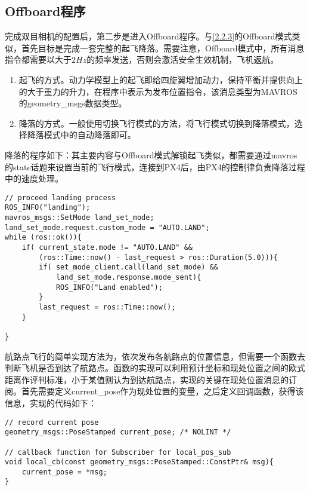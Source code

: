 \subsection{Offboard程序} \label{4.2.2}

完成双目相机的配置后，第二步是进入Offboard程序。与\ref{2.2.3}的Offboard模式类似，首先目标是完成一套完整的起飞降落。需要注意，Offboard模式中，所有消息指令都需要以大于$2Hz$的频率发送，否则会激活安全生效机制，飞机返航。

\begin{enumerate}
	\item 起飞的方式。动力学模型上的起飞即给四旋翼增加动力，保持平衡并提供向上的大于重力的升力，在程序中表示为发布位置指令，该消息类型为MAVROS的geometry\_msgs数据类型。
	\item 降落的方式。一般使用切换飞行模式的方法，将飞行模式切换到降落模式，选择降落模式中的自动降落即可。
\end{enumerate}

降落的程序如下：其主要内容与Offboard模式解锁起飞类似，都需要通过mavros的state话题来设置当前的飞行模式，连接到PX4后，由PX4的控制律负责降落过程中的速度处理。

\begin{verbatim}
// proceed landing process
ROS_INFO("landing");
mavros_msgs::SetMode land_set_mode;
land_set_mode.request.custom_mode = "AUTO.LAND";
while (ros::ok()){
    if( current_state.mode != "AUTO.LAND" &&
        (ros::Time::now() - last_request > ros::Duration(5.0))){
        if( set_mode_client.call(land_set_mode) &&
            land_set_mode.response.mode_sent){
            ROS_INFO("Land enabled");
        }
        last_request = ros::Time::now();
    }

}
\end{verbatim}

航路点飞行的简单实现方法为，依次发布各航路点的位置信息，但需要一个函数去判断飞机是否到达了航路点。函数的实现可以利用预计坐标和现处位置之间的欧式距离作评判标准，小于某值则认为到达航路点，实现的关键在现处位置消息的订阅。首先需要定义current\_pose作为现处位置的变量，之后定义回调函数，获得该信息，实现的代码如下：

\begin{verbatim}
// record current pose
geometry_msgs::PoseStamped current_pose; /* NOLINT */

// callback function for Subscriber for local_pos_sub
void local_cb(const geometry_msgs::PoseStamped::ConstPtr& msg){
    current_pose = *msg;
}
\end{verbatim}

